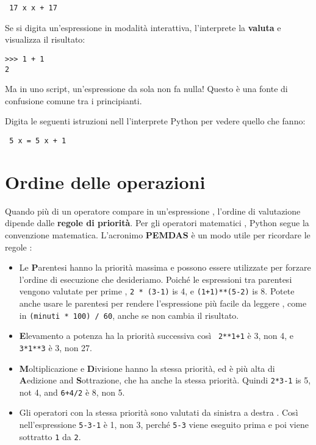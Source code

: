  

\beforeverb \begin{verbatim} 17 x x + 17 \end{verbatim} \afterverb
%
Se si digita un'espressione in modalit\`{a} interattiva, l'interprete la
{\bf valuta} e visualizza il risultato:

\beforeverb \begin{verbatim}
>>> 1 + 1
2 \end{verbatim} \afterverb
%
Ma in uno script, un'espressione da sola non fa nulla! Questo \`{e} una
fonte di confusione comune tra i principianti.

\begin{ex} Digita le seguenti istruzioni nell l'interprete Python per
vedere quello che fanno:

\beforeverb \begin{verbatim} 5 x = 5 x + 1 \end{verbatim} \afterverb
%
\end{ex}


\section{Ordine delle operazioni} 
 

Quando pi\`{u} di un operatore compare in un'espressione , l'ordine di
valutazione dipende dalle \textbf{regole di priorit\`{a}}. Per gli
operatori matematici , Python segue la convenzione matematica.
L'acronimo \textbf{PEMDAS }\`{e} un modo utile per ricordare le regole :


\begin{itemize}

\item Le {\bf P}arentesi hanno la priorit\`{a} massima e possono essere
utilizzate per forzare l'ordine di esecuzione che desideriamo.
Poich\'{e} le espressioni tra parentesi vengono valutate per prime ,
{\tt 2 * (3-1)} is 4, e {\tt (1+1)**(5-2)} is 8. Potete anche usare le parentesi per rendere l'espressione pi\`{u} facile da leggere , come in {\tt (minuti *
100) / 60}, anche se non cambia il risultato.

\item {\bf E}levamento a potenza ha la priorit\`{a} successiva cos\`{i} {\tt
2**1+1} \`{e} 3, non 4, e {\tt 3*1**3} \`{e} 3, non 27.

\item {\bf M}oltiplicazione e  {\bf D}ivisione hanno la stessa priorit\`{a}, ed \`{e} pi\`{u} alta di {\bf A}edizione and {\bf S}ottrazione, che ha anche la stessa priorit\`{a}. 
Quindi {\tt 2*3-1} is 5, not 4, and {\tt 6+4/2}
\`{e} 8, non 5.

\item Gli operatori con la stessa priorit\`{a} sono valutati da sinistra a destra . Cos\`{i} nell'espressione {\tt 5-3-1} \`{e} 1, non 3, perch\'e {\tt 5-3}
viene eseguito prima e poi viene sottratto  {\tt 1} da {\tt 2}.

\end{itemize}


